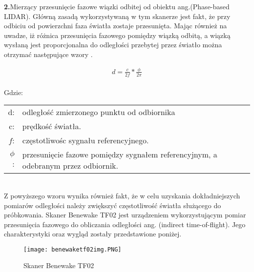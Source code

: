 \documentclass[10pt]{article}
\begin{document}
\textbf{2.}Mierzący przesunięcie fazowe wiązki odbitej od obiektu ang.(Phase-based LIDAR). Główną zasadą wykorzystywaną w tym skanerze jest fakt, że przy odbiciu od powierzchni faza światła zostaje przesunięta. Mając również na uwadze, iż różnica przesunięcia fazowego pomiędzy wiązką odbitą, a wiązką wysłaną jest proporcjonalna do odległości przebytej przez światło można otrzymać następujące wzory \cite{articleLidar}.

\begin{equation}
    \begin{aligned}
       d=\frac{c}{2f}* \frac{\phi}{2\pi}\\
    \end{aligned}
\end{equation}

Gdzie:\\

\hspace*{3em}
\begin{tabular}{rl}
    d:& odległość zmierzonego punktu od odbiornika \\
    c:& prędkość światła. \\
    $f$:& częstotliwośc sygnału referencyjnego. \\
    $\phi$:& przesunięcie fazowe pomiędzy sygnałem referencyjnym, a odebranym przez odbiornik. \\
\end{tabular}\\
Z powyższego wzoru wynika również fakt, że w celu uzyskania dokładniejszych pomiarów odległości należy zwiększyć częstotliwość światła służącego do próbkowania.\newline
\newline
Skaner Benewake TF02 jest urządzeniem wykorzystującym pomiar przesunięcia fazowego do obliczania odległości ang. (indirect time-of-flight). Jego charakterystyki oraz wygląd zostały przedstawione poniżej.

\begin{figure}[H]
  \centering
  \texttt{[image: benewaketf02img.PNG]}
  \caption{Skaner Benewake TF02}   
  \label{fig:picture}
\end{figure}
\end{document}
